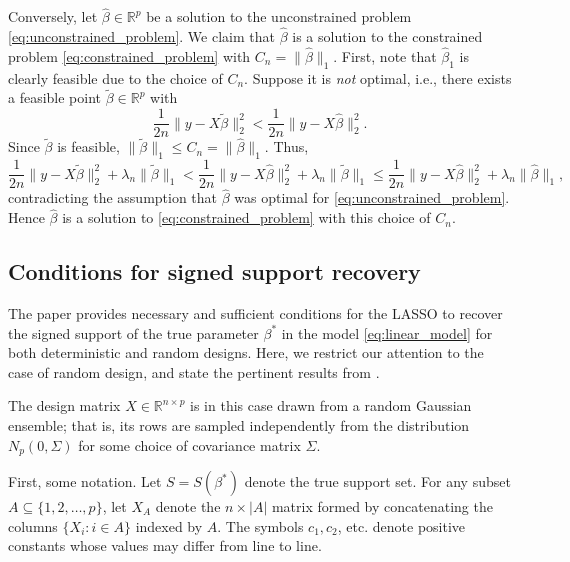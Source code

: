 \documentclass[letterpaper,12pt]{article}
\newcommand{\norm}[1]{\lVert#1\rVert}
\begin{document}
Conversely, let $\hat{\beta} \in \mathbb{R}^p$ be a solution to the
unconstrained problem \eqref{eq:unconstrained_problem}. We claim that
$\hat{\beta}$ is a solution to the constrained problem
\eqref{eq:constrained_problem} with $C_n =
\norm{\hat{\beta}}_1$. First, note that $\hat{\beta}_1$ is clearly
feasible due to the choice of $C_n$. Suppose it is \emph{not} optimal,
i.e., there exists a feasible point $\tilde{\beta} \in \mathbb{R}^p$
with
\begin{equation*}
  \frac{1}{2n} \norm{y - X\tilde{\beta}}_2^2
    < \frac{1}{2n} \norm{y - X\hat{\beta}}_2^2.
\end{equation*}
Since $\tilde{\beta}$ is feasible,
$\norm{\tilde{\beta}}_1 \leq C_n = \norm{\hat{\beta}}_1$. Thus,
\begin{equation*}
  \frac{1}{2n} \norm{y - X\tilde{\beta}}_2^2 + \lambda_n \norm{\tilde{\beta}}_1
    < \frac{1}{2n} \norm{y - X\hat{\beta}}_2^2
      + \lambda_n \norm{\tilde{\beta}}_1
    \leq \frac{1}{2n} \norm{y - X\hat{\beta}}_2^2
      + \lambda_n \norm{\hat{\beta}}_1,
\end{equation*}
contradicting the assumption that $\hat{\beta}$ was optimal for
\eqref{eq:unconstrained_problem}. Hence $\hat{\beta}$ is a solution to
\eqref{eq:constrained_problem} with this choice of $C_n$.

\subsection*{Conditions for signed support recovery}

The paper \cite{wainwright06} provides necessary and sufficient
conditions for the LASSO to recover the signed support of the true
parameter $\beta^\ast$ in the model \eqref{eq:linear_model} for both
deterministic and random designs. Here, we restrict our attention to
the case of random design, and state the pertinent results from
\cite{wainwright06}.

The design matrix $X \in \mathbb{R}^{n \times p}$ is in this case
drawn from a random Gaussian ensemble; that is, its rows are sampled
independently from the distribution $N_p(0, \Sigma)$ for some choice
of covariance matrix $\Sigma$.

First, some notation. Let $S = S(\beta^\ast)$ denote the true support
set. For any subset $A \subseteq \{1, 2, \ldots, p\}$, let $X_A$
denote the $n \times |A|$ matrix formed by concatenating the columns
$\{X_i : i \in A\}$ indexed by $A$. The symbols $c_1, c_2$,
etc. denote positive constants whose values may differ from line to
line.
\end{document}

